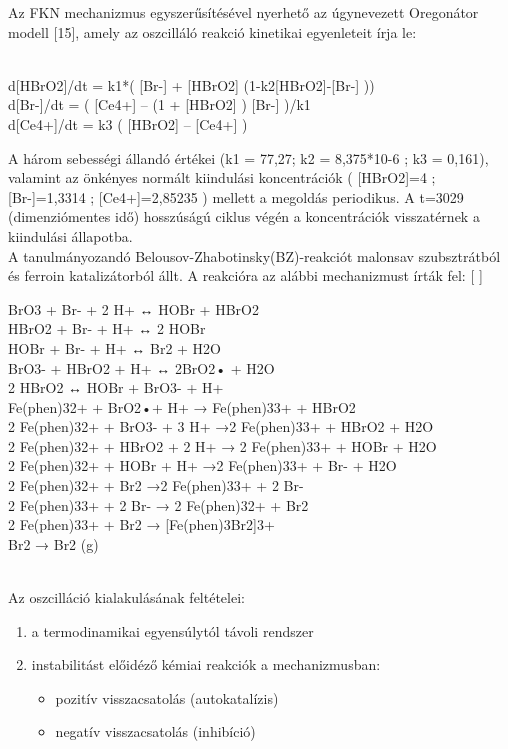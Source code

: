 Az FKN mechanizmus egyszerűsítésével nyerhető az úgynevezett Oregonátor modell [15], amely az oszcilláló reakció kinetikai egyenleteit írja le:
\begin{center}
\\  d[HBrO2]/dt = k1*( [Br-] + [HBrO2] (1-k2[HBrO2]-[Br-] ))
\\  d[Br-]/dt = ( [Ce4+] – (1 + [HBrO2] ) [Br-] )/k1
\\  d[Ce4+]/dt = k3 ( [HBrO2] – [Ce4+] )\\
\end{center}
A három sebességi állandó értékei (k1 = 77,27;    k2 = 8,375*10-6 ; k3 = 0,161), valamint az önkényes normált kiindulási koncentrációk ( [HBrO2]=4 ; [Br-]=1,3314 ; [Ce4+]=2,85235 ) mellett a megoldás periodikus. A t=3029 (dimenziómentes idő) hosszúságú ciklus végén a koncentrációk visszatérnek a kiindulási állapotba.
\\A tanulmányozandó Belousov-Zhabotinsky(BZ)-reakciót malonsav szubsztrátból és ferroin katalizátorból állt. 
A reakcióra az alábbi mechanizmust írták fel: [ ]
\begin{center}
BrO3 + Br- + 2 H+ ↔ HOBr + HBrO2
\\HBrO2 + Br- + H+ ↔ 2 HOBr
\\HOBr + Br- + H+ ↔ Br2 + H2O
\\BrO3- + HBrO2 + H+ ↔ 2BrO2• + H2O
\\2 HBrO2 ↔ HOBr + BrO3- + H+
\\Fe(phen)32+ + BrO2•+ H+ → Fe(phen)33+ + HBrO2
\\2 Fe(phen)32+ +  BrO3- + 3 H+ →2 Fe(phen)33+ + HBrO2 + H2O
\\2 Fe(phen)32+ +  HBrO2 + 2 H+ → 2 Fe(phen)33+ + HOBr + H2O
\\2 Fe(phen)32+ +  HOBr +  H+ →2 Fe(phen)33+ + Br- + H2O
\\2 Fe(phen)32+ +  Br2 →2 Fe(phen)33+ + 2 Br-
\\2 Fe(phen)33+ +  2 Br- → 2 Fe(phen)32+ + Br2
\\2 Fe(phen)33+ +  Br2 → [Fe(phen)3Br2]3+
\\Br2 → Br2 (g)
\end{center}
\\
Az oszcilláció kialakulásának feltételei:
\begin{enumerate}
\item a termodinamikai egyensúlytól távoli rendszer
\item instabilitást előidéző kémiai reakciók a mechanizmusban:
 \begin{itemize}
\item pozitív visszacsatolás (autokatalízis)
\item negatív visszacsatolás (inhibíció)
\end{itemize}
\end{enumerate}
